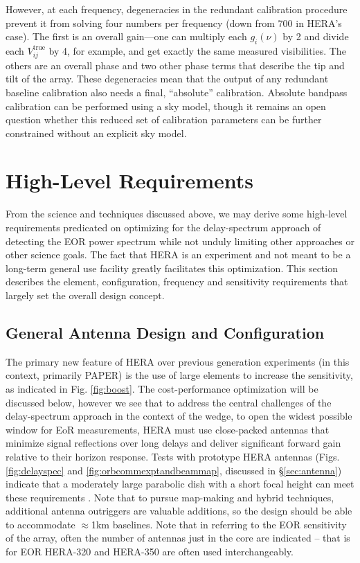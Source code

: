 \documentclass[preprint,11pt]{aastex}
\begin{document}
However, at each frequency, degeneracies in the redundant calibration procedure prevent it from solving four numbers per frequency (down from 700 in HERA's case). The first is an overall gain---one can multiply each $g_i(\nu)$ by 2 and divide each $V_{ij}^\text{true}$ by 4, for example, and get exactly the same measured visibilities. The others are an overall phase and two other phase terms that describe the tip and tilt of the array. These degeneracies mean that the output of any redundant baseline calibration also needs a final, ``absolute'' calibration. Absolute bandpass calibration can be performed using a sky model, though it remains an open question whether this reduced set of calibration parameters can be further constrained without an explicit sky model.


\section{High-Level Requirements} 
\label{sec:requirements}
From the science and techniques discussed above, we may derive some high-level requirements predicated on optimizing for the delay-spectrum approach of detecting the EOR power spectrum while not unduly limiting other approaches or other science goals.  The fact that HERA is an experiment and not meant to be a long-term general use facility greatly facilitates this optimization. This section describes the element, configuration, frequency and sensitivity requirements that largely set the overall design concept.

\subsection{General Antenna Design and Configuration}
The primary new feature of HERA over previous generation experiments (in this context, primarily PAPER) is the use of large elements to increase the sensitivity, as indicated in Fig. \ref{fig:boost}.  The cost-performance optimization will 
be discussed below, however we see that to address the central challenges of the delay-spectrum approach in the context of the wedge, to open the widest possible window for EoR measurements, 
HERA must use close-packed antennas that
minimize signal reflections over long delays and deliver significant forward gain relative to their horizon response.
Tests with prototype HERA antennas (Figs.  \ref{fig:delayspec} and \ref{fig:orbcommexptandbeammap}, discussed in \S\ref{sec:antenna})
indicate that a moderately large parabolic dish with a short focal height can meet these requirements
\citep{ewall-wice_et_al2016-EoXLimits,neben_et_al2016,thyagarajan_et_al2016}.  Note that to pursue map-making and hybrid techniques, additional antenna outriggers are valuable additions, so the design
should be able to accommodate $\approx$1km baselines.  Note that in referring to the EOR sensitivity of the array, often the number of antennas just in the core are
indicated -- that is for EOR HERA-320 and HERA-350 are often used interchangeably.
\end{document}
